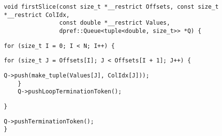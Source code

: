 \begin{lstlisting}[style=cppcode]
void firstSlice(const size_t *__restrict Offsets, const size_t *__restrict ColIdx,
                const double *__restrict Values,
                dpref::Queue<tuple<double, size_t>> *Q) {
\end{lstlisting}\vspace{-\baselineskip}

\begin{lstlisting}[style=cppcode, backgroundcolor=\color{yellow!15}, firstnumber=last]
  for (size_t I = 0; I < N; I++) {
\end{lstlisting}\vspace{-\baselineskip}

\begin{lstlisting}[style=cppcode, backgroundcolor=\color{green!15}, firstnumber=last]
    for (size_t J = Offsets[I]; J < Offsets[I + 1]; J++) {
\end{lstlisting}\vspace{-\baselineskip}

\begin{lstlisting}[style=cppcode, firstnumber=last]
      Q->push(make_tuple(Values[J], ColIdx[J]));
    }
    Q->pushLoopTerminationToken();
\end{lstlisting}\vspace{-\baselineskip}

\begin{lstlisting}[style=cppcode, backgroundcolor=\color{yellow!15}, firstnumber=last]
  }
\end{lstlisting}\vspace{-\baselineskip}

\begin{lstlisting}[style=cppcode, firstnumber=last]
  Q->pushTerminationToken();
}
\end{lstlisting}\vspace{-\baselineskip}
